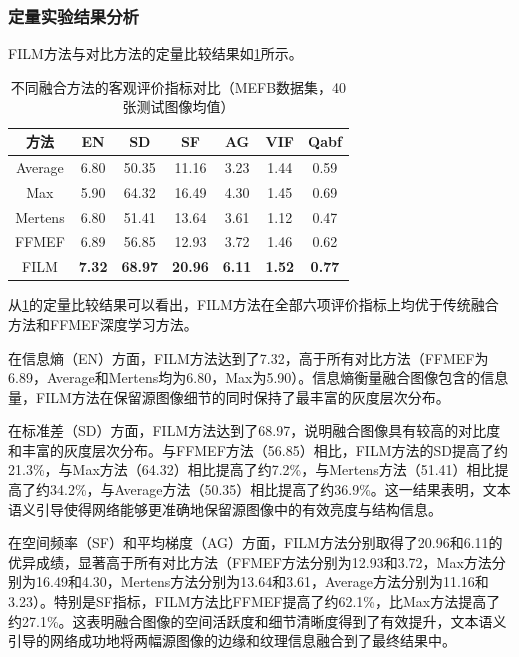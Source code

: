 \subsubsection{定量实验结果分析}\label{sec:quantitative_results}

FILM方法与对比方法的定量比较结果如\cref{tab:quantitative}所示。

\begin{table}[htb!]
    \caption{不同融合方法的客观评价指标对比（MEFB数据集，40张测试图像均值）}
    \label{tab:quantitative}
    \centering
    \begin{tabular}{ccccccc}
        \hline
        方法 & EN & SD & SF & AG & VIF & Qabf \\
        \hline
        Average & 6.80 & 50.35 & 11.16 & 3.23 & 1.44 & 0.59 \\
        Max & 5.90 & 64.32 & 16.49 & 4.30 & 1.45 & 0.69 \\
        Mertens & 6.80 & 51.41 & 13.64 & 3.61 & 1.12 & 0.47 \\
        FFMEF & 6.89 & 56.85 & 12.93 & 3.72 & 1.46 & 0.62 \\
        FILM & \textbf{7.32} & \textbf{68.97} & \textbf{20.96} & \textbf{6.11} & \textbf{1.52} & \textbf{0.77} \\
        \hline
    \end{tabular}
\end{table}

从\cref{tab:quantitative}的定量比较结果可以看出，FILM方法在全部六项评价指标上均优于传统融合方法和FFMEF深度学习方法。

在信息熵（EN）方面，FILM方法达到了7.32，高于所有对比方法（FFMEF为6.89，Average和Mertens均为6.80，Max为5.90）。信息熵衡量融合图像包含的信息量，FILM方法在保留源图像细节的同时保持了最丰富的灰度层次分布。

在标准差（SD）方面，FILM方法达到了68.97，说明融合图像具有较高的对比度和丰富的灰度层次分布。与FFMEF方法（56.85）相比，FILM方法的SD提高了约21.3\%，与Max方法（64.32）相比提高了约7.2\%，与Mertens方法（51.41）相比提高了约34.2\%，与Average方法（50.35）相比提高了约36.9\%。这一结果表明，文本语义引导使得网络能够更准确地保留源图像中的有效亮度与结构信息。

在空间频率（SF）和平均梯度（AG）方面，FILM方法分别取得了20.96和6.11的优异成绩，显著高于所有对比方法（FFMEF方法分别为12.93和3.72，Max方法分别为16.49和4.30，Mertens方法分别为13.64和3.61，Average方法分别为11.16和3.23）。特别是SF指标，FILM方法比FFMEF提高了约62.1\%，比Max方法提高了约27.1\%。这表明融合图像的空间活跃度和细节清晰度得到了有效提升，文本语义引导的网络成功地将两幅源图像的边缘和纹理信息融合到了最终结果中。

